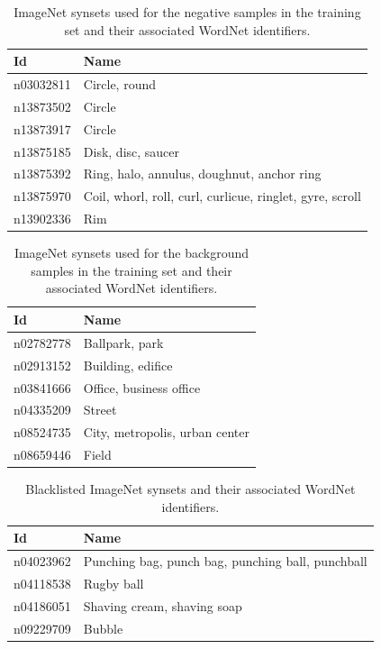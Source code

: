 \documentclass{sig-alternate-05-2015}
\begin{document}
{{      \begin{table}
        \centering
        \caption{ImageNet synsets used for the negative samples in the training set and their associated WordNet identifiers.}
				\label{tab:negative_samples}
        \begin{tabularx}{1.0\columnwidth}{@{}lX@{}}
          \toprule
          \textbf{Id} & \textbf{Name} \\
          \midrule
            n03032811 & Circle, round \\
            n13873502 & Circle \\
            n13873917 & Circle \\
            n13875185 & Disk, disc, saucer \\
            n13875392 & Ring, halo, annulus, doughnut, anchor ring \\
            n13875970 & Coil, whorl, roll, curl, curlicue, ringlet, gyre, scroll \\
            n13902336 & Rim \\
          \bottomrule
        \end{tabularx}
      \end{table}

      \begin{table}
        \centering
        \caption{ImageNet synsets used for the background samples in the training set and their associated WordNet identifiers.}
				\label{tab:background_samples}
        \begin{tabularx}{1.0\columnwidth}{@{}lX@{}}
          \toprule
          \textbf{Id} & \textbf{Name} \\
          \midrule
            n02782778 & Ballpark, park \\
            n02913152 & Building, edifice \\
            n03841666 & Office, business office \\
            n04335209 & Street \\
            n08524735 & City, metropolis, urban center \\
            n08659446 & Field \\
          \bottomrule
        \end{tabularx}
      \end{table}

      \begin{table}
        \centering
        \caption{Blacklisted ImageNet synsets and their associated WordNet identifiers.}
        \label{tab:blacklisted_synsets}
        \begin{tabularx}{1.0\columnwidth}{@{}lX@{}}
          \toprule
          \textbf{Id} & \textbf{Name} \\
          \midrule
              n04023962 & Punching bag, punch bag, punching ball, punchball \\
              n04118538 & Rugby ball \\
              n04186051 & Shaving cream, shaving soap \\
              n09229709 & Bubble \\
          \bottomrule
        \end{tabularx}
      \end{table}
		}
	}
\end{document}
